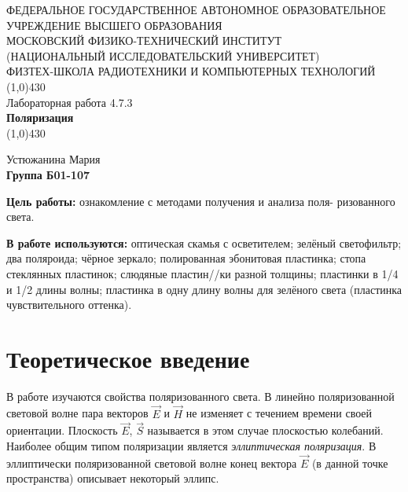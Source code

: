 \documentclass[11pt]{article}
\begin{document}
\begin{titlepage}
\begin{center}
\large{\small ФЕДЕРАЛЬНОЕ ГОСУДАРСТВЕННОЕ АВТОНОМНОЕ ОБРАЗОВАТЕЛЬНОЕ\\ УЧРЕЖДЕНИЕ ВЫСШЕГО ОБРАЗОВАНИЯ\\ МОСКОВСКИЙ ФИЗИКО-ТЕХНИЧЕСКИЙ ИНСТИТУТ\\ (НАЦИОНАЛЬНЫЙ ИССЛЕДОВАТЕЛЬСКИЙ УНИВЕРСИТЕТ)\\ ФИЗТЕХ-ШКОЛА РАДИОТЕХНИКИ И КОМПЬЮТЕРНЫХ ТЕХНОЛОГИЙ}
\vfill
\line(1,0){430}\\[1mm]
\huge{Лабораторная работа 4.7.3}\\
\huge\textbf{Поляризация}\\
\line(1,0){430}\\[1mm]
\vfill
\begin{flushright}
\normalsize{Устюжанина Мария}\\
\normalsize{\textbf{Группа Б01-107}}\\
\end{flushright}
\end{center}
\end{titlepage}

\par \textbf{Цель работы:} ознакомление с методами получения и анализа поля- ризованного света.

\par \textbf{В работе используются:} оптическая скамья с осветителем; зелёный светофильтр; два поляроида; чёрное зеркало; полированная эбонитовая пластинка; стопа стеклянных пластинок; слюдяные пластин//ки разной толщины; пластинки в 1/4 и 1/2 длины волны; пластинка в одну длину волны для зелёного света (пластинка чувствительного оттенка).


\section{Теоретическое введение}
    В работе изучаются свойства поляризованного света. В линейно поляризованной световой волне пара векторов $\vec{E}$ и $\vec{H}$ не изменяет с течением времени своей ориентации. Плоскость $\vec{E}$, $\vec{S}$ называется в этом случае плоскостью колебаний. Наиболее общим типом поляризации является \textit{эллиптическая поляризация}. В эллиптически поляризованной световой волне конец вектора $\vec{E}$ (в данной точке пространства) описывает некоторый эллипс.
    
\end{document}
